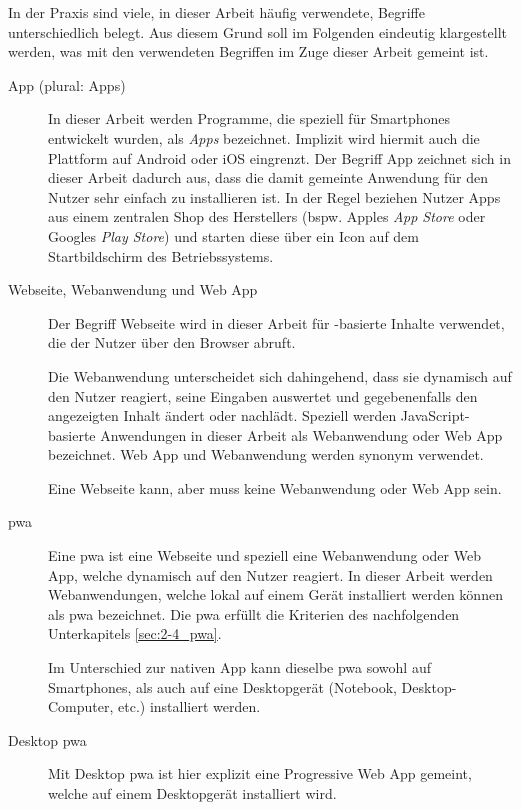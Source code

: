 In der Praxis sind viele, in dieser Arbeit häufig verwendete, Begriffe unterschiedlich belegt. Aus diesem Grund soll im Folgenden eindeutig klargestellt werden, was mit den verwendeten Begriffen im Zuge dieser Arbeit gemeint ist.

\begin{description}
	\item[App (plural: Apps)]
		In dieser Arbeit werden Programme, die speziell für Smartphones entwickelt wurden, als \textit{Apps} bezeichnet. Implizit wird hiermit auch die Plattform auf Android oder iOS eingrenzt. Der Begriff App zeichnet sich in dieser Arbeit dadurch aus, dass die damit gemeinte Anwendung für den Nutzer sehr einfach zu installieren ist. In der Regel beziehen Nutzer Apps aus einem zentralen Shop des Herstellers (bspw. Apples \textit{App Store} oder Googles \textit{Play Store}) und starten diese über ein Icon auf dem Startbildschirm des Betriebssystems.
		
	\item[Webseite, Webanwendung und Web App]
		Der Begriff Webseite wird in dieser Arbeit für -basierte Inhalte verwendet, die der Nutzer über den Browser abruft.
		
		Die Webanwendung unterscheidet sich dahingehend, dass sie dynamisch auf den Nutzer reagiert, seine Eingaben auswertet und gegebenenfalls den angezeigten Inhalt ändert oder nachlädt. Speziell werden JavaScript-basierte Anwendungen in dieser Arbeit als Webanwendung oder Web App bezeichnet. Web App und Webanwendung werden synonym verwendet.
		
		Eine Webseite kann, aber muss keine Webanwendung oder Web App sein.
	
	\item[\acf{pwa}]
		Eine \acf{pwa} ist eine Webseite und speziell eine Webanwendung oder Web App, welche dynamisch auf den Nutzer reagiert.
		In dieser Arbeit werden Webanwendungen, welche lokal auf einem Gerät installiert werden können als \acf{pwa} bezeichnet. Die \ac{pwa} erfüllt die Kriterien des nachfolgenden Unterkapitels \ref{sec:2-4_pwa}.
		
		Im Unterschied zur nativen App kann dieselbe \ac{pwa} sowohl auf Smartphones, als auch auf eine Desktopgerät (Notebook, Desktop-Computer, etc.) installiert werden.
		
	\item [Desktop \ac{pwa}]
		Mit Desktop \ac{pwa} ist hier explizit eine Progressive Web App gemeint, welche auf einem Desktopgerät installiert wird.
			

\end{description}
